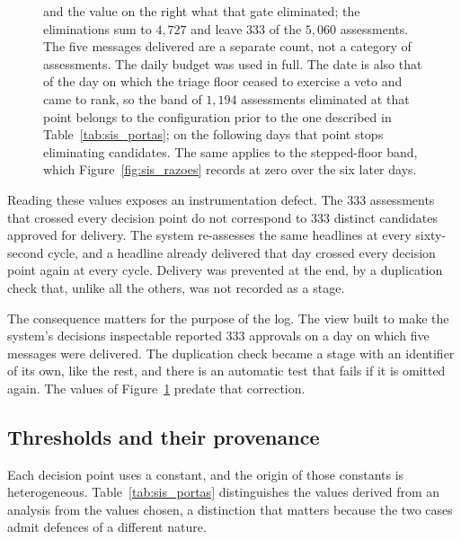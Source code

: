 \begin{figure}[htbp]
{and the value on the right what that gate eliminated; the eliminations sum to $4{,}727$ and leave
$333$ of the $5{,}060$ assessments. The five messages delivered are a separate count, not a
category of assessments. The daily budget was used in full. The date is also that of the day on
which the triage floor ceased to exercise a veto and came to rank, so the band of $1{,}194$
assessments eliminated at that point belongs to the configuration prior to the one described in
Table~\ref{tab:sis_portas}; on the following days that point stops eliminating candidates.
The same applies to the stepped-floor band, which Figure~\ref{fig:sis_razoes} records at
zero over the six later days.}
\label{fig:sis_funil}
\end{figure}

Reading these values exposes an instrumentation defect. The $333$ assessments that crossed every
decision point do not correspond to $333$ distinct candidates approved for delivery. The system
re-assesses the same headlines at every sixty-second cycle, and a headline already delivered that
day crossed every decision point again at every cycle. Delivery was prevented at the end, by a
duplication check that, unlike all the others, was not recorded as a stage.

The consequence matters for the purpose of the log. The view built to make the system's decisions
inspectable reported $333$ approvals on a day on which five messages were delivered. The
duplication check became a stage with an identifier of its own, like the rest, and there is an
automatic test that fails if it is omitted again. The values of Figure~\ref{fig:sis_funil} predate
that correction.

\subsection{Thresholds and their provenance}

Each decision point uses a constant, and the origin of those constants is heterogeneous.
Table~\ref{tab:sis_portas} distinguishes the values derived from an analysis from the values
chosen, a distinction that matters because the two cases admit defences of a different nature.

